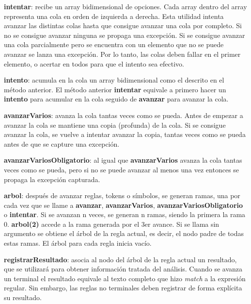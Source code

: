 \documentclass{report}
\begin{document}
	\vspace{10px}
	\noindent
	\textbf{intentar}: recibe un array bidimensional de opciones. Cada array dentro del array representa una cola en orden de izquierda a derecha. Esta utilidad intenta avanzar las distintas colas hasta que consigue avanzar una cola por completo. Si no se consigue avanzar ninguna se propaga una excepción. Si se consigue avanzar una cola parcialmente pero se encuentra con un elemento que no se puede avanzar se lanza una excepción. Por lo tanto, las colas deben fallar en el primer elemento, o acertar en todos para que el intento sea efectivo.
	
	\vspace{10px}
	\noindent
	\textbf{intento}: acumula en la cola un array bidimensional como el descrito en el método anterior. El método anterior \textbf{intentar} equivale a primero hacer un \textbf{intento} para acumular en la cola seguido de \textbf{avanzar} para avanzar la cola.
	
	\vspace{10px}
	\noindent
	\textbf{avanzarVarios}: avanza la cola tantas veces como se pueda. Antes de empezar a avanzar la cola se mantiene una copia (profunda) de la cola. Si se consigue avanzar la cola, se vuelve a intentar avanzar la copia, tantas veces como se pueda antes de que se capture una excepción.   
	
	\vspace{10px}
	\noindent
	\textbf{avanzarVariosObligatorio}: al igual que \textbf{avanzarVarios} avanza la cola tantas veces como se pueda, pero si no se puede avanzar al menos una vez entonces se propaga la excepción capturada.
	
	\vspace{10px}
	\noindent
	\textbf{arbol}: después de avanzar reglas, tokens o símbolos, se generan ramas, una por cada vez que se llame a \textbf{avanzar}, \textbf{avanzarVarios}, \textbf{avanzarVariosObligatorio} o \textbf{intentar}. Si se avanzan n veces, se generan n ramas, siendo la primera la rama 0. \textbf{arbol(2)} accede a la rama generada por el 3er avance. Si se llama sin argumento se obtiene el árbol de la regla actual, es decir, el nodo padre de todas estas ramas. El árbol para cada regla inicia vacío.
	
	\vspace{10px}
	\noindent
	\textbf{registrarResultado}: asocia al nodo del árbol de la regla actual un resultado, que se utilizará para obtener información tratada del análisis. Cuando se avanza un terminal el resultado equivale al texto completo que hizo \textit{match} a la expresión regular. Sin embargo, las reglas no terminales deben registrar de forma explícita su resultado. 
	
\end{document}
